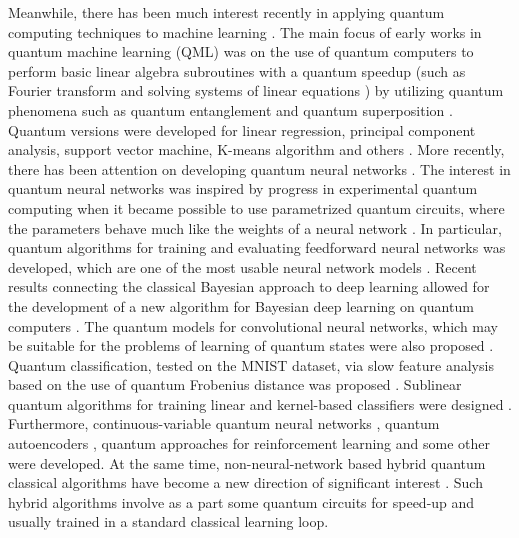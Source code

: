 \documentclass[pra,showkeys,twocolumn,showpacs]{revtex4-1}
\begin{document}
Meanwhile, there has been much interest recently in applying quantum computing techniques to machine learning \cite{dunjko2018, biamonte2017, schuld2014, carleo2019}. 
The main focus of early works in quantum machine learning (QML) was on the use of quantum computers to perform basic linear algebra subroutines with a quantum speedup (such as Fourier transform and solving systems of linear equations \cite{wiebe2012,harrow2009,childs2017}) by utilizing quantum phenomena such as quantum entanglement and quantum superposition \cite{biamonte2017, schuld2014}.  
Quantum versions were developed for linear regression, principal component analysis, support vector machine, K-means algorithm and others \cite{lloyd2013,lloyd2014,dunjko2016,paparo2014,rebentrost2014}. 
More recently, there has been attention on developing quantum neural networks \cite{kamruzzaman2019, schuld2014b, jeswal2019, broughton2020}. 
The interest in quantum neural networks was inspired by progress in experimental quantum computing when it became possible to use parametrized quantum circuits, 
where the parameters behave much like the weights of a neural network \cite{lewenstein1994}. 
In particular, quantum algorithms for training and evaluating feedforward neural networks was developed, 
which are one of the most usable neural network models \cite{allcock2018, tacchino2019}. 
Recent results connecting the classical Bayesian approach to deep learning allowed for the development of a new algorithm for Bayesian deep learning on quantum computers \cite{zhao2019}. 
The quantum models for convolutional neural networks, which may be suitable for the problems of learning of quantum states were also proposed \cite{cong2019, liu2019}. 
Quantum classification, tested on the MNIST dataset, via slow feature analysis based on the use of quantum Frobenius distance was proposed \cite{kerenidis2018}. 
Sublinear quantum algorithms for training linear and kernel-based classifiers were designed \cite{li2019}. 
Furthermore, continuous-variable quantum neural networks \cite{killoran2019}, 
quantum autoencoders \cite{bondarenko2019}, 
quantum approaches for reinforcement learning \cite{dunjko2017, nautrup2019, foesel2018} 
and some other \cite{rebentrost2018, purushothaman1997, verdon2019, cherny2019, byrnes2013, mishra2019, pyrkov2019, vinci2019, lu2019} were developed. 
At the same time, non-neural-network based hybrid quantum classical algorithms have become a new direction of significant interest \cite{mcclean2016,arute2020,akshay2020}. 
Such hybrid algorithms involve as a part some quantum circuits for speed-up and usually trained in a standard classical learning loop. 
\end{document}
